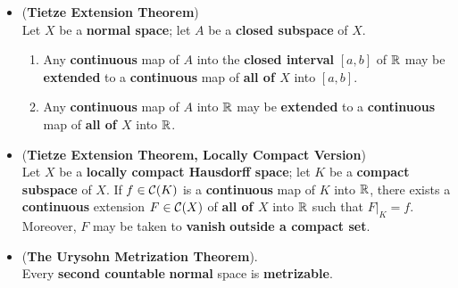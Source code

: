 \documentclass[11pt]{article}
\begin{document}
\begin{itemize}
\item \begin{theorem} (\textbf{Tietze Extension Theorem}) \citep{munkres2000topology, reed1980methods}\\
Let $X$ be a \textbf{normal space}; let $A$ be a \textbf{closed subspace} of $X$.
\begin{enumerate}
\item Any \textbf{continuous} map of $A$ into the \textbf{closed interval} $[a, b]$ of ${\mathbb R}$ may be \textbf{extended}
to a \textbf{continuous} map of \textbf{all of $X$} into $[a, b]$.
\item Any \textbf{continuous} map of $A$ into ${\mathbb R}$ may be \textbf{extended} to a \textbf{continuous} map of \textbf{all of $X$} into ${\mathbb R}$.
\end{enumerate}
\end{theorem}


\item \begin{theorem} (\textbf{Tietze Extension Theorem, Locally Compact Version}) \citep{folland2013real}\\
Let $X$ be a \textbf{locally compact Hausdorff space}; let $K$ be a \textbf{compact subspace} of $X$. If $f \in {\mathcal C}(K)$ is a \textbf{continuous} map of $K$ into ${\mathbb R}$,   there exists a \textbf{continuous} extension $F \in {\mathcal C}(X)$ of \textbf{all of $X$} into ${\mathbb R}$ such that $F|_{K} = f$. Moreover, $F$ may be taken to \textbf{vanish}\textbf{ outside a compact set}.
\end{theorem} 

\item \begin{theorem} (\textbf{The Urysohn Metrization Theorem}). \citep{munkres1975topology, folland2013real}\\
Every \textbf{second countable} \textbf{normal} space is \textbf{metrizable}.
\end{theorem}
\end{itemize}
\end{document}
